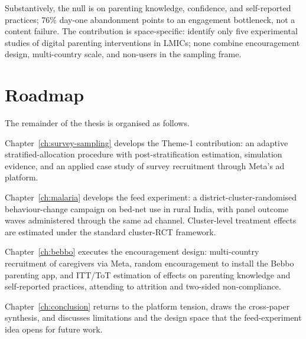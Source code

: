 Substantively, the null is on parenting knowledge, confidence, and self-reported practices; 76\% day-one abandonment points to an engagement bottleneck, not a content failure. The contribution is space-specific: \citet{Jaggi2025} identify only five experimental studies of digital parenting interventions in LMICs; none combine encouragement design, multi-country scale, and non-users in the sampling frame.

\section{Roadmap}
\label{sec:intro:roadmap}

The remainder of the thesis is organised as follows.

Chapter~\ref{ch:survey-sampling} develops the Theme-1 contribution: an adaptive stratified-allocation procedure with post-stratification estimation, simulation evidence, and an applied case study of survey recruitment through Meta's ad platform.

Chapter~\ref{ch:malaria} develops the feed experiment: a district-cluster-randomised behaviour-change campaign on bed-net use in rural India, with panel outcome waves administered through the same ad channel. Cluster-level treatment effects are estimated under the standard cluster-RCT framework.

Chapter~\ref{ch:bebbo} executes the encouragement design: multi-country recruitment of caregivers via Meta, random encouragement to install the Bebbo parenting app, and ITT/ToT estimation of effects on parenting knowledge and self-reported practices, attending to attrition and two-sided non-compliance.

Chapter~\ref{ch:conclusion} returns to the platform tension, draws the cross-paper synthesis, and discusses limitations and the design space that the feed-experiment idea opens for future work.

\printbibliography[heading=subbibliography, title={References for Chapter \thechapter}]
